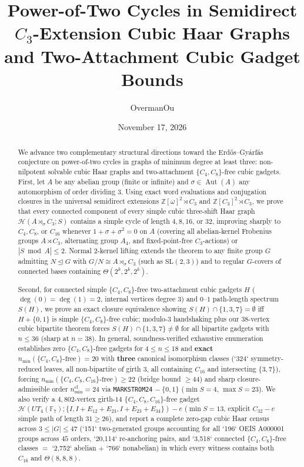 \documentclass[11pt]{amsart}
\title[Semidirect $C_3$-Extension Haar Graphs and Gadget Bounds]{Power-of-Two Cycles in Semidirect $C_3$-Extension Cubic Haar Graphs and Two-Attachment Cubic Gadget Bounds}
\author{OvermanOu}
\date{November 17, 2026}
\theoremstyle{definition}
\theoremstyle{remark}
\newcommand{\F}{\mathbb{F}}
\newcommand{\Z}{\mathbb{Z}}
\newcommand{\Haar}{\mathcal{H}}
\newcommand{\Aut}{\operatorname{Aut}}
\begin{document}
\begin{abstract}
We advance two complementary structural directions toward the Erd\H{o}s--Gy\'arf\'as conjecture on power-of-two cycles in graphs of minimum degree at least three: non-nilpotent solvable cubic Haar graphs and two-attachment $\{C_4, C_8\}$-free cubic gadgets. First, let $A$ be any abelian group (finite or infinite) and $\sigma \in \Aut(A)$ any automorphism of order dividing $3$. Using exact word evaluations and conjugation closures in the universal semidirect extensions $\Z[\omega]^2 \rtimes C_3$ and $\Z[C_3]^2 \rtimes C_3$, we prove that every connected component of every simple cubic three-shift Haar graph $\Haar(A \rtimes_\sigma C_3; S)$ contains a simple cycle of length $4, 8, 16$, or $32$, improving sharply to $C_4, C_8$, or $C_{16}$ whenever $1 + \sigma + \sigma^2 = 0$ on $A$ (covering all abelian-kernel Frobenius groups $A \rtimes C_3$, alternating group $A_4$, and fixed-point-free $C_3$-actions) or $|S \bmod A| \le 2$. Normal $2$-kernel lifting extends the theorem to any finite group $G$ admitting $N \trianglelefteq G$ with $G/N \cong A \rtimes_\sigma C_3$ (such as $\mathrm{SL}(2,3)$) and to regular $G$-covers of connected bases containing $\Theta(2^k, 2^k, 2^k)$.

Second, for connected simple $\{C_4, C_8\}$-free two-attachment cubic gadgets $H$ ($\deg(0)=\deg(1)=2$, internal vertices degree $3$) and $0\text{--}1$ path-length spectrum $S(H)$, we prove an exact closure equivalence showing $S(H) \cap \{1,3,7\} = \emptyset$ iff $H + \{0,1\}$ is simple $\{C_4, C_8\}$-free cubic; modulo-$3$ handshaking plus our $38$-vertex cubic bipartite theorem forces $S(H) \cap \{1,3,7\} \ne \emptyset$ for all bipartite gadgets with $n \le 36$ (sharp at $n = 38$). In general, soundness-verified exhaustive enumeration establishes zero $\{C_4, C_8\}$-free gadgets for $4 \le n \le 18$ and \textbf{exact} $n_{\min}(\{C_4, C_8\}\text{-free}) = 20$ with \textbf{three} canonical isomorphism classes (`324` symmetry-reduced leaves, all non-bipartite of girth $3$, all containing $C_{16}$ and intersecting $\{3,7\}$), forcing $n_{\min}(\{C_4, C_8, C_{16}\}\text{-free}) \ge 22$ (bridge bound $\ge 44$) and sharp closure-admissible order $n_{\min}^{\mathrm{cl}} = 24$ via \texttt{MARKSTROM24} $-\ \{0,1\}$ ($\min S = 4$, $\max S = 23$). We also verify a $4{,}802$-vertex girth-$14$ $\{C_4, C_8, C_{16}\}$-free gadget $\Haar(UT_4(\F_7); \{I, I+E_{12}+E_{23}, I+E_{23}+E_{34}\}) - e$ ($\min S = 13$, explicit $C_{32}-e$ simple path of length $31 \ge 26$), and report a complete zero-gap cubic Haar census across $3 \le |G| \le 47$ (`151` two-generated groups accounting for all `196` OEIS A000001 groups across $45$ orders, `20,114` re-anchoring pairs, and `3,518` connected $\{C_4, C_8\}$-free classes $=$ `2,752` abelian $+$ `766` nonabelian) in which every witness contains both $C_{16}$ and $\Theta(8,8,8)$.
\end{abstract}
\end{document}

